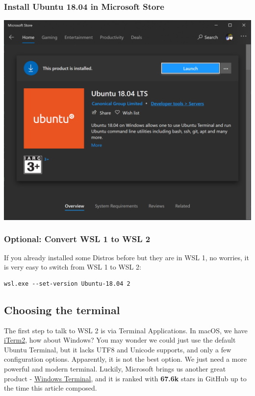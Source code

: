 \documentclass[10pt]{article}
\begin{document}
\subsubsection{Install Ubuntu 18.04 in Microsoft Store}
\label{sec:org38dd771}
\begin{center}
\includegraphics[width=.9\linewidth]{ubuntu18.04.png}
\end{center}

\subsubsection{Optional: Convert WSL 1 to WSL 2}
\label{sec:orgd98dfa1}
If you already installed some Distros before but they are in WSL 1, no worries, it is very easy to switch from WSL 1 to WSL 2:
\begin{verbatim}
wsl.exe --set-version Ubuntu-18.04 2
\end{verbatim}

\subsection{Choosing the terminal}
\label{sec:orgcf124de}
The first step to talk to WSL 2 is via Terminal Applications. In macOS, we have \href{https://iterm2.com/}{iTerm2}, how about Windows? You may wonder we could just use the default Ubuntu Terminal, but it lacks UTF8 and Unicode supports, and only a few configuration options. Apparently, it is not the best option. We just need a more powerful and modern terminal. Luckily, Microsoft brings us another great product - \href{https://github.com/microsoft/terminal}{Windows Terminal}, and it is ranked with \textbf{67.6k} stars in GitHub up to the time this article composed.
\end{document}
